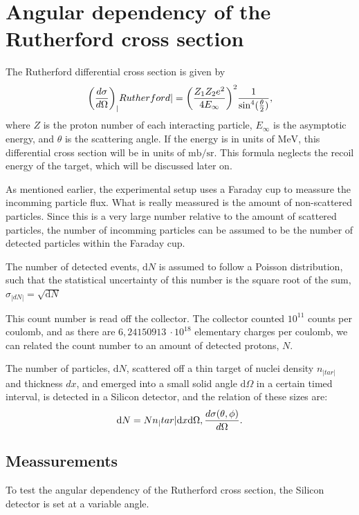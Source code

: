 \section{Angular dependency of the Rutherford cross section}
The Rutherford differential cross section \parencite[p. 16]{noteBB} is given by
\begin{align}
    {\left( \diff[d]{\sigma}{\Omega} \right)}_|Rutherford| =
    {\left(\frac{Z_1Z_2 e^2}{4E_{\infty}} \right)}^2
    \frac{1}{{{\sin}^4(\frac{\theta}{2})}},
\end{align}
where $Z$ is the proton number of each interacting particle, $E_{\infty}$ is
the asymptotic energy, and $\theta$ is the scattering angle. If the energy is
in units of $\si{\mega\electronvolt}$, this differential cross section will be in units
of $\si{\milli\barn\per\steradian}$.
This formula neglects the recoil energy of the target, which will be discussed
later on. 


As mentioned earlier, the experimental setup uses a Faraday cup to meassure the
incomming particle flux. What is really meassured is the amount of
non-scattered particles. Since this is a very large number relative to the amount of scattered
particles, the number of incomming particles can be assumed to be the number of
detected particles within the Faraday cup.

The number of detected events, $\mathrm{d}N$ is assumed to follow a Poisson
distribution, such that the statistical uncertainty of this number is the
square root of the sum, $\sigma_|dN| = \sqrt{\mathrm{d}N}$

This count number is read off the collector. The collector counted $10^{11}$
counts per coulomb, and as there are $6,24150913\ \cdot10^{18}$ elementary
charges per coulomb, we can related the count number to an amount of detected
protons, $N$.

The number of particles, $\mathrm{d}N$, scattered off a thin target of nuclei density
$n_|tar|$ and thickness $dx$, and emerged into a small solid angle
$\mathrm{d}\Omega$ in a certain timed interval, is detected in a Silicon
detector, and the relation of these sizes are:
\begin{equation}
    \mathrm{d}N = N n_|tar| \mathrm{d}x \mathrm{d}\Omega,
    \diff[d]{\sigma(\theta,\phi)}{\Omega}.
\end{equation}

\subsection{Meassurements}
To test the angular dependency of the Rutherford cross section, the Silicon
detector is set at a variable angle.

